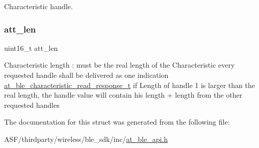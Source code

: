 Characteristic handle. 

\mbox{\label{structat__ble__char__list_a5dda30258d10935828949e9b5d7efb98}} 
\subsubsection{\texorpdfstring{att\_len}{att\_len}}
{\footnotesize\ttfamily uint16\+\_\+t att\+\_\+len}

Characteristic length \+: must be the real length of the Characteristic every requested handle shall be delivered as one indication \mbox{\hyperlink{structat__ble__characteristic__read__response__t}{at\+\_\+ble\+\_\+characteristic\+\_\+read\+\_\+response\+\_\+t}} if Length of handle 1 is larger than the real length, the handle value will contain his length + length from the other requested handles 

The documentation for this struct was generated from the following file\+:\begin{DoxyCompactItemize}
\item 
A\+S\+F/thirdparty/wireless/ble\+\_\+sdk/inc/\mbox{\hyperlink{at__ble__api_8h}{at\+\_\+ble\+\_\+api.\+h}}\end{DoxyCompactItemize}
